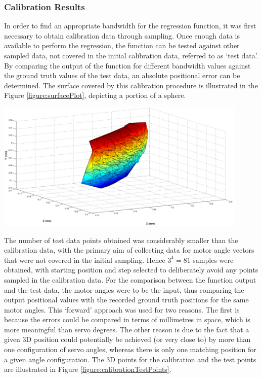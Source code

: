 \documentclass[11pt]{article}
\begin{document}
\subsubsection{Calibration Results}
In order to find an appropriate bandwidth for the regression function, it was first necessary to obtain calibration data through sampling. Once enough data is available to perform the regression, the function can be tested against other sampled data, not covered in the initial calibration data, referred to as `test data'. By comparing the output of the function for different bandwidth values against the ground truth values of the test data, an absolute positional error can be determined. The surface covered by this calibration procedure is illustrated in the Figure \ref{figure:surfacePlot}, depicting a portion of a sphere.



\begin{center}
\includegraphics[width=0.9\textwidth]{images/surfPlot.png}
\label{figure:surfacePlot}
\end{center}


The number of test data points obtained was considerably smaller than the calibration data, with the primary aim of collecting data for motor angle vectors that were not covered in the initial sampling. Hence $3^4 = 81$ samples were obtained, with starting position and step selected to deliberately avoid any points sampled in the calibration data. For the comparison between the function output and the test data, the motor angles were to be the input, thus comparing the output positional values with the recorded ground truth positions for the same motor angles. This `forward' approach was used for two reasons. The first is because the errors could be compared in terms of millimetres in space, which is more meaningful than servo degrees. The other reason is due to the fact that a given 3D position could potentially be achieved (or very close to) by more than one configuration of servo angles, whereas there is only one matching position for a given angle configuration. The 3D points for the calibration and the test points are illustrated in Figure \ref{figure:calibrationTestPoints}. 
\end{document}
